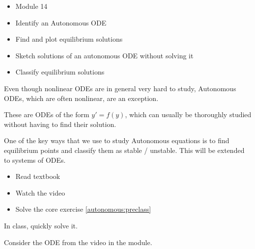 \begin{lesson}

	\begin{itemize}
		\item Module 14
	\end{itemize}

	\begin{itemize}
		\item Identify an Autonomous ODE
		\item Find and plot equilibrium solutions
		\item Sketch solutions of an autonomous ODE without solving it
		\item Classify equilibrium solutions
	\end{itemize}
	

Even though nonlinear ODEs are in general very hard to study, Autonomous ODEs, which are often nonlinear, are an exception. 

These are ODEs of the form $y'=f(y)$, which can usually be thoroughly studied without having to find their solution. 

One of the key ways that we use to study Autonomous equations is to find equilibrium points and classify them as stable / unstable.
This will be extended to systems of ODEs.


\begin{itemize}
	\item Read textbook
	\item Watch the video
	\item Solve the core exercise \ref{autonomous:preclass}
\end{itemize}


\end{lesson}


\begin{annotation}
\begin{goals}
	In class, quickly solve it.
\end{goals}	
\end{annotation}
\question \label{autonomous:preclass}
	Consider the ODE from the video in the module.

